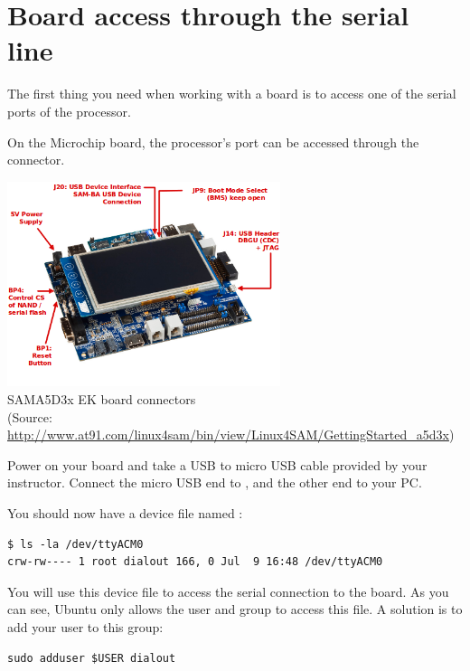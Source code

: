 
\section{Board access through the serial line}

The first thing you need when working with a board is to access one of
the serial ports of the processor.

On the Microchip board, the processor's  port can be accessed
through the  connector.

\begin{center}
\includegraphics[width=8cm]{labs/boottime-getting-started/a5d3x_board_presentation.png}
\\
SAMA5D3x EK board connectors \\
{\small
(Source:
\url{http://www.at91.com/linux4sam/bin/view/Linux4SAM/GettingStarted_a5d3x})}
\end{center}

Power on your board and take a USB to micro USB cable provided by your
instructor. Connect the micro USB end to , and the other end
to your PC.

You should now have a device file named :

\begin{verbatim}
$ ls -la /dev/ttyACM0
crw-rw---- 1 root dialout 166, 0 Jul  9 16:48 /dev/ttyACM0
\end{verbatim}

You will use this device file to access the serial connection to the board.
As you can see, Ubuntu only allows the  user and
 group to access this file. A solution is to add your user
to this  group:

\begin{verbatim}
sudo adduser $USER dialout
\end{verbatim}

